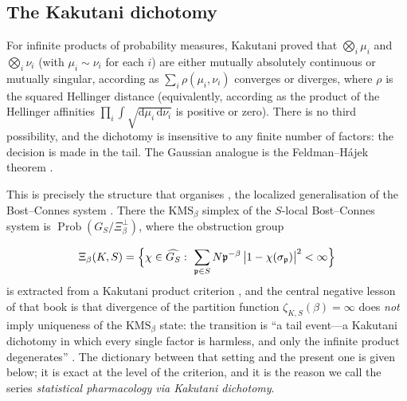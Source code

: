 \documentclass[11pt,reqno]{amsart}
\theoremstyle{plain}
\theoremstyle{definition}
\theoremstyle{remark}
\numberwithin{equation}{section}
\DeclareMathOperator{\Prob}{Prob}
\newcommand{\dd}{\mathrm{d}}
\begin{document}
\subsection*{The Kakutani dichotomy}
For infinite products of probability measures, Kakutani \cite{Kakutani1948} proved that $\bigotimes_i\mu_i$ and $\bigotimes_i\nu_i$ (with $\mu_i\sim\nu_i$ for each $i$) are either mutually absolutely continuous or mutually singular, according as $\sum_i\rho(\mu_i,\nu_i)$ converges or diverges, where $\rho$ is the squared Hellinger distance (equivalently, according as the product of the Hellinger affinities $\prod_i\int\sqrt{\dd\mu_i\,\dd\nu_i}$ is positive or zero). There is no third possibility, and the dichotomy is insensitive to any finite number of factors: the decision is made in the tail. The Gaussian analogue is the Feldman--H\'ajek theorem \cite{Feldman1958,Hajek1958}.

\begin{sloppypar}
This is precisely the structure that organises \cite{Chen2026}, the localized generalisation of the Bost--Connes system \cite{BostConnes1995}. There the $\mathrm{KMS}_\beta$ simplex of the $S$-local Bost--Connes system is $\Prob(G_S/\Xi_\beta^\perp)$, where the obstruction group
\end{sloppypar}
\[
\Xi_\beta(K,S)=\Bigl\{\chi\in\widehat{G_S}:\ \sum_{\mathfrak p\in S}N\mathfrak p^{-\beta}\,\bigl|1-\chi(\sigma_{\mathfrak p})\bigr|^2<\infty\Bigr\}
\]
is extracted from a Kakutani product criterion \cite[Ch.~1, Props.~3.3--3.4 and Thm.~3.6]{Chen2026}, and the central negative lesson of that book is that divergence of the partition function $\zeta_{K,S}(\beta)=\infty$ does \emph{not} imply uniqueness of the $\mathrm{KMS}_\beta$ state: the transition is ``a tail event---a Kakutani dichotomy in which every single factor is harmless, and only the infinite product degenerates'' \cite[Preface]{Chen2026}. The dictionary between that setting and the present one is given below; it is exact at the level of the criterion, and it is the reason we call the series \emph{statistical pharmacology via Kakutani dichotomy}.
\end{document}
